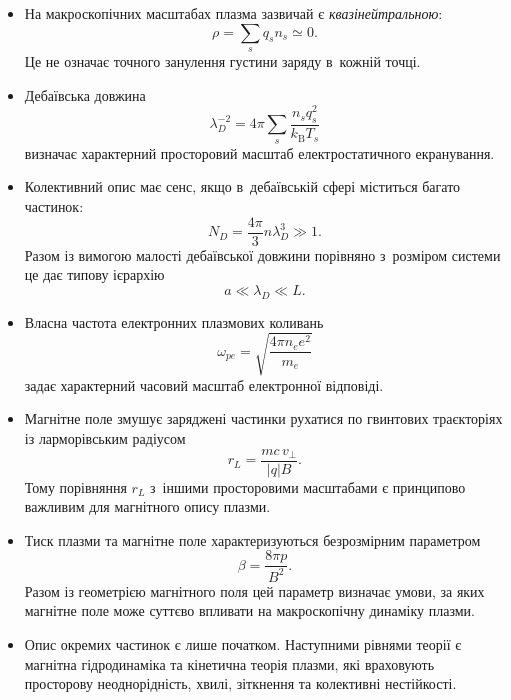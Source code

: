 \begin{itemize}
	\item На макроскопічних масштабах плазма зазвичай є \emph{квазінейтральною}:
	      \begin{equation*}
		      \rho=\sum_s q_s n_s\simeq0.
	      \end{equation*}
	      Це не означає точного занулення густини заряду в~кожній точці.

	\item Дебаївська довжина
	      \begin{equation*}
		      \lambda_D^{-2}
		      =4\pi\sum_s\frac{n_s q_s^2}{k_{\mathrm B}T_s}
	      \end{equation*}
	      визначає характерний просторовий масштаб електростатичного екранування.

	\item Колективний опис має сенс, якщо в~дебаївській сфері міститься багато частинок:
	      \begin{equation*}
		      N_D=\frac{4\pi}{3}n\lambda_D^3\gg1.
	      \end{equation*}
	      Разом із вимогою малості дебаївської довжини порівняно з~розміром системи це дає типову ієрархію
	      \begin{equation*}
		      a\ll\lambda_D\ll L.
	      \end{equation*}

	\item Власна частота електронних плазмових коливань
	      \begin{equation*}
		      \omega_{pe}
		      =\sqrt{\frac{4\pi n_e e^2}{m_e}}
	      \end{equation*}
	      задає характерний часовий масштаб електронної відповіді.

	\item Магнітне поле змушує заряджені частинки рухатися по гвинтових траєкторіях із ларморівським радіусом
	      \begin{equation*}
		      r_L=\frac{mc\,v_\perp}{|q|B}.
	      \end{equation*}
	      Тому порівняння $r_L$ з~іншими просторовими масштабами є принципово важливим для магнітного опису плазми.

	\item Тиск плазми та магнітне поле характеризуються безрозмірним параметром
	      \begin{equation*}
		      \beta=\frac{8\pi p}{B^2}.
	      \end{equation*}
	      Разом із геометрією магнітного поля цей параметр визначає умови, за яких магнітне поле може суттєво впливати на макроскопічну динаміку плазми.

	\item Опис окремих частинок є лише початком. Наступними рівнями теорії є магнітна гідродинаміка та кінетична теорія плазми, які враховують просторову неоднорідність, хвилі, зіткнення та колективні нестійкості.
\end{itemize}



